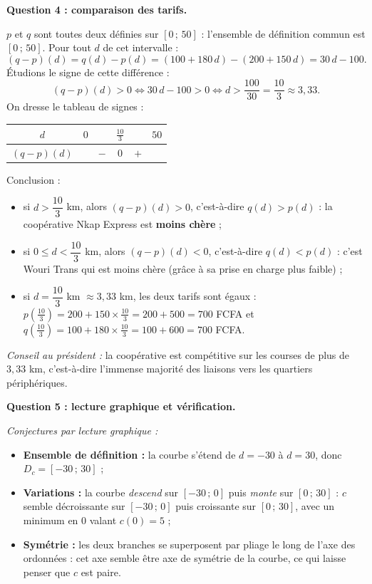 \documentclass[11pt]{article}
\newcommand{\cle}[1]{{\popxbold\color{popdark}#1}}
\begin{document}
\begin{exoresolu}
\medskip
\textbf{Question 4 : comparaison des tarifs.}

$p$ et $q$ sont toutes deux définies sur $[0\,;\,50]$ : l'ensemble de définition commun est $[0\,;\,50]$. Pour tout $d$ de cet intervalle :
\[ (q - p)(d) = q(d) - p(d) = (100 + 180\,d) - (200 + 150\,d) = 30\,d - 100. \]
Étudions le signe de cette différence :
\[ (q-p)(d) > 0 \iff 30\,d - 100 > 0 \iff d > \frac{100}{30} = \frac{10}{3} \approx 3{,}33. \]
On dresse le tableau de signes :
\begin{center}
\begin{tabular}{|c|ccccc|}\hline
$d$ & $0$ & & $\frac{10}{3}$ & & $50$ \\ \hline
$(q-p)(d)$ & & $-$ & $0$ & $+$ & \\ \hline
\end{tabular}
\end{center}
Conclusion :
\begin{itemize}
\item si $d > \dfrac{10}{3}$ km, alors $(q-p)(d) > 0$, c'est-à-dire $q(d) > p(d)$ : la coopérative \og Nkap Express \fg{} est \textbf{moins chère} ;
\item si $0 \leq d < \dfrac{10}{3}$ km, alors $(q-p)(d) < 0$, c'est-à-dire $q(d) < p(d)$ : c'est \og Wouri Trans \fg{} qui est moins chère (grâce à sa prise en charge plus faible) ;
\item si $d = \dfrac{10}{3}$ km $\approx 3{,}33$ km, les deux tarifs sont égaux : $p\!\left(\tfrac{10}{3}\right) = 200 + 150 \times \tfrac{10}{3} = 200 + 500 = 700$ FCFA et $q\!\left(\tfrac{10}{3}\right) = 100 + 180 \times \tfrac{10}{3} = 100 + 600 = 700$ FCFA.
\end{itemize}
\emph{Conseil au président :} la coopérative est compétitive sur les courses de plus de $3{,}33$ km, c'est-à-dire l'immense majorité des liaisons vers les quartiers périphériques.

\medskip
\textbf{Question 5 : lecture graphique et vérification.}

\emph{Conjectures par lecture graphique :}
\begin{itemize}
\item \textbf{Ensemble de définition :} la courbe s'étend de $d = -30$ à $d = 30$, donc $D_c = [-30\,;\,30]$ ;
\item \textbf{Variations :} la courbe \emph{descend} sur $[-30\,;\,0]$ puis \emph{monte} sur $[0\,;\,30]$ : $c$ semble décroissante sur $[-30\,;\,0]$ puis croissante sur $[0\,;\,30]$, avec un minimum en $0$ valant $c(0) = 5$ ;
\item \textbf{Symétrie :} les deux branches se superposent par pliage le long de l'axe des ordonnées : cet axe semble être \cle{axe de symétrie} de la courbe, ce qui laisse penser que $c$ est \cle{paire}.
\end{itemize}


\end{exoresolu}
\end{document}
